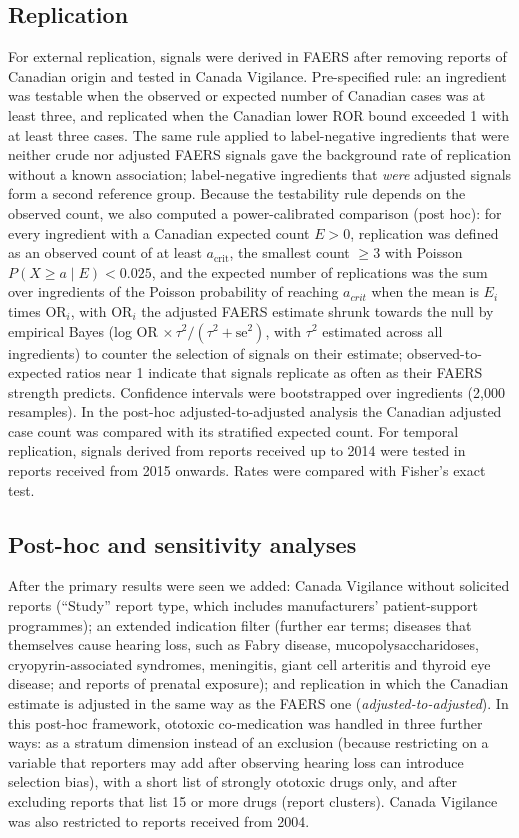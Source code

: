 \documentclass[11pt]{article}
\begin{document}
\subsection{Replication}
For external replication, signals were derived in FAERS after removing reports of Canadian origin and tested in Canada
Vigilance. Pre-specified rule: an ingredient was testable when the observed or expected number of Canadian cases was at
least three, and replicated when the Canadian lower ROR bound exceeded 1 with at least three cases. The same rule applied to
label-negative ingredients that were neither crude nor adjusted FAERS signals gave the background rate of replication
without a known association; label-negative ingredients that \emph{were} adjusted signals form a second reference group.
Because the testability rule depends on the observed count, we also computed a power-calibrated comparison (post hoc): for
every ingredient with a Canadian expected count $E>0$, replication was defined as an observed count of at least
$a_{\mathrm{crit}}$, the smallest count $\geq 3$ with Poisson $P(X\geq a\mid E)<0.025$, and the expected number of
replications was the sum over ingredients of the Poisson probability of reaching $a_{crit}$ when the mean is $E_i$ times OR$_i$, with OR$_i$ the adjusted FAERS
estimate shrunk towards the null by empirical Bayes (log OR $\times\,\tau^2/(\tau^2+\mathrm{se}^2)$, with $\tau^2$ estimated
across all ingredients) to counter the selection of signals on their estimate; observed-to-expected ratios near 1 indicate that
signals replicate as often as their FAERS strength predicts. Confidence intervals were bootstrapped over ingredients (2{,}000
resamples). In the post-hoc adjusted-to-adjusted analysis the Canadian adjusted case count was compared with its stratified
expected count. For
temporal replication, signals derived from reports received up to 2014 were tested in reports received from 2015 onwards.
Rates were compared with Fisher's exact test.

\subsection{Post-hoc and sensitivity analyses}
After the primary results were seen we added: Canada Vigilance without solicited reports (``Study'' report type, which
includes manufacturers' patient-support programmes); an extended indication filter (further ear terms; diseases that
themselves cause hearing loss, such as Fabry disease, mucopolysaccharidoses, cryopyrin-associated syndromes, meningitis,
giant cell arteritis and thyroid eye disease; and reports of prenatal exposure); and replication in which the Canadian
estimate is adjusted in the same way as the FAERS one (\emph{adjusted-to-adjusted}). In this post-hoc framework, ototoxic
co-medication was handled in three further ways: as a stratum dimension instead of an exclusion (because restricting on a
variable that reporters may add after observing hearing loss can introduce selection bias), with a short list of strongly
ototoxic drugs only, and after excluding reports that list 15 or more drugs (report clusters). Canada Vigilance was also
restricted to reports received from 2004.
\end{document}
